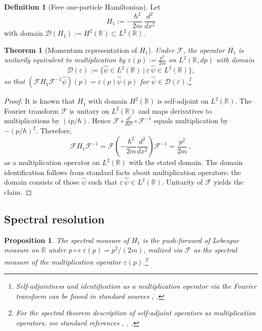 \documentclass[11pt]{article}
\theoremstyle{definition}
\newtheorem{definition}{Definition}
\theoremstyle{plain}
\newtheorem{theorem}{Theorem}
\newtheorem{proposition}{Proposition}
\numberwithin{equation}{section}
\begin{document}
\begin{definition}[Free one-particle Hamiltonian]
Let
\[
H_1:= -\frac{\hbar^2}{2m}\,\frac{d^2}{dx^2}
\]
with domain $\mathcal{D}(H_1):=H^2(\mathbb{R})\subset L^2(\mathbb{R})$.
\end{definition}

\begin{theorem}[Momentum representation of $H_1$]
Under $\mathcal{F}$, the operator $H_1$ is unitarily equivalent to multiplication by $\varepsilon(p):=\frac{p^2}{2m}$ on $L^2(\mathbb{R},dp)$ with domain
\[
\mathcal{D}(\varepsilon):=\Big\{ \widehat{\psi}\in L^2(\mathbb{R}) \ \big|\ \varepsilon\,\widehat{\psi}\in L^2(\mathbb{R})\Big\},
\]
so that $(\mathcal{F}H_1\mathcal{F}^{-1}\widehat{\psi})(p)=\varepsilon(p)\widehat{\psi}(p)$ for $\widehat{\psi}\in\mathcal{D}(\varepsilon)$.\footnote{Self-adjointness and identification as a multiplication operator via the Fourier transform can be found in standard sources \cite[Sec.~1.6]{kowalskispectral}, \cite[pp.~3--4]{feldmanlaplacian}.}
\end{theorem}

\begin{proof}
It is known that $H_1$ with domain $H^2(\mathbb{R})$ is self-adjoint on $L^2(\mathbb{R})$. The Fourier transform $\mathcal{F}$ is unitary on $L^2(\mathbb{R})$ and maps derivatives to multiplications by $(ip/\hbar)$. Hence $\mathcal{F}\circ \frac{d^2}{dx^2}\circ \mathcal{F}^{-1}$ equals multiplication by $-(p/\hbar)^2$. Therefore,
\[
\mathcal{F}H_1\mathcal{F}^{-1}=\mathcal{F}\left(-\frac{\hbar^2}{2m}\frac{d^2}{dx^2}\right)\mathcal{F}^{-1}=\frac{p^2}{2m}\,,
\]
as a multiplication operator on $L^2(\mathbb{R})$ with the stated domain. The domain identification follows from standard facts about multiplication operators: the domain consists of those $\widehat{\psi}$ such that $\varepsilon\,\widehat{\psi}\in L^2(\mathbb{R})$. Unitarity of $\mathcal{F}$ yields the claim.\end{proof}

\subsection{Spectral resolution}
\begin{proposition}
The spectral measure of $H_1$ is the push-forward of Lebesgue measure on $\mathbb{R}$ under $p\mapsto \varepsilon(p)=p^2/(2m)$, realized via $\mathcal{F}$ as the spectral measure of the multiplication operator $\varepsilon(p)$.\footnote{For the spectral theorem description of self-adjoint operators as multiplication operators, see standard references \cite[Ch.~2]{kowalskispectral}, \cite[Sec.~2]{taylorst}, \cite[Lecture~1]{danaspec}.}
\end{proposition}
\end{document}
